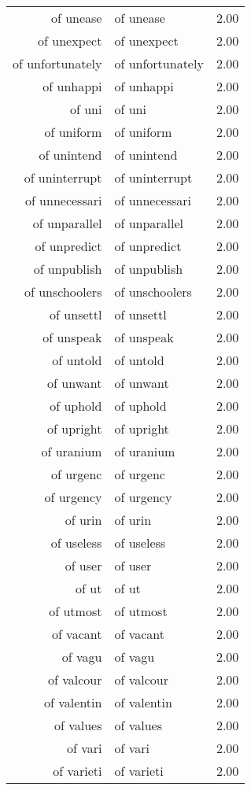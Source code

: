 \begin{table}[ht]
\begin{tabular}{rlr}
  of unease & of unease & 2.00 \\ 
  of unexpect & of unexpect & 2.00 \\ 
  of unfortunately & of unfortunately & 2.00 \\ 
  of unhappi & of unhappi & 2.00 \\ 
  of uni & of uni & 2.00 \\ 
  of uniform & of uniform & 2.00 \\ 
  of unintend & of unintend & 2.00 \\ 
  of uninterrupt & of uninterrupt & 2.00 \\ 
  of unnecessari & of unnecessari & 2.00 \\ 
  of unparallel & of unparallel & 2.00 \\ 
  of unpredict & of unpredict & 2.00 \\ 
  of unpublish & of unpublish & 2.00 \\ 
  of unschoolers & of unschoolers & 2.00 \\ 
  of unsettl & of unsettl & 2.00 \\ 
  of unspeak & of unspeak & 2.00 \\ 
  of untold & of untold & 2.00 \\ 
  of unwant & of unwant & 2.00 \\ 
  of uphold & of uphold & 2.00 \\ 
  of upright & of upright & 2.00 \\ 
  of uranium & of uranium & 2.00 \\ 
  of urgenc & of urgenc & 2.00 \\ 
  of urgency & of urgency & 2.00 \\ 
  of urin & of urin & 2.00 \\ 
  of useless & of useless & 2.00 \\ 
  of user & of user & 2.00 \\ 
  of ut & of ut & 2.00 \\ 
  of utmost & of utmost & 2.00 \\ 
  of vacant & of vacant & 2.00 \\ 
  of vagu & of vagu & 2.00 \\ 
  of valcour & of valcour & 2.00 \\ 
  of valentin & of valentin & 2.00 \\ 
  of values & of values & 2.00 \\ 
  of vari & of vari & 2.00 \\ 
  of varieti & of varieti & 2.00 \\ 

\end{tabular}
\end{table}
